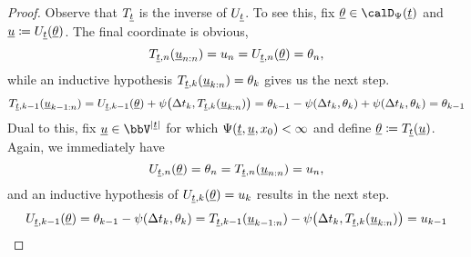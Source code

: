\begin{proof}
  Observe that $T_{\underline t}$ is the inverse of $U_{\underline t}$.
  To see this, fix $\underline\twistVar \in \momentSpace(\underline t)$ and $\underline{u} \coloneqq U_{\underline t}(\underline{\theta})$.
  The final coordinate is obvious,
  \begin{equation*}
    T_{\underline t, n}(\underline{u}_{n:n}) = u_n = U_{\underline t,n}(\underline{\theta}) = \theta_n,
  \end{equation*}
  while an inductive hypothesis $T_{\underline t, k}(\underline{u}_{k:n}) = \theta_k$ gives us the next step.
  \begin{equation*}
    T_{\underline t, k-1}(\underline{u}_{k-1:n}) 
    = U_{\underline t, k-1}(\underline{\theta}) + \psi\big(\Delta t_k, T_{\underline t, k}(\underline{u}_{k:n}) \big)
    = \theta_{k-1} - \psi(\Delta t_k, \theta_k) + \psi(\Delta t_k, \theta_k )
    = \theta_{k-1}
  \end{equation*}
  Dual to this, fix $\underline\momentVar \in \vecSpace^{|\underline t|}$ for which $\Psi(\underline t, \underline{u}, x_0) < \infty$ and define $\underline{\theta} \coloneqq T_{\underline t}(\underline{u})$.
  Again, we immediately have
  \begin{equation*}
    U_{\underline t, n}(\underline{\theta}) = \theta_n = T_{\underline t, n}(\underline{u}_{n:n}) = u_n,
  \end{equation*}
  and an inductive hypothesis of $U_{\underline t, k}(\underline{\theta}) = u_k$ results in the next step.
  \begin{equation*}
    U_{\underline t, k-1}(\underline{\theta}) = \theta_{k-1} - \psi(\Delta t_k, \theta_k) = T_{\underline t,k-1}(\underline{u}_{k-1:n}) - \psi\big(\Delta t_k, T_{\underline t, k}(\underline{u}_{k:n})\big) = u_{k-1}
  \end{equation*}


\end{proof}
